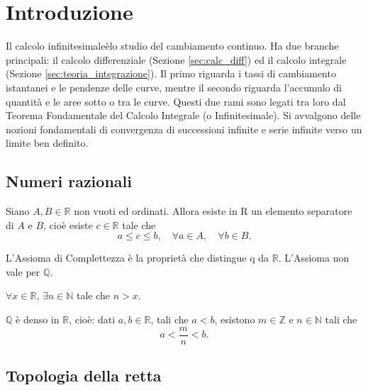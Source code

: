 \section{Introduzione}

Il calcolo infinitesimaleèlo studio del cambiamento continuo. Ha due branche principali: il calcolo differenziale (Sezione \ref{sec:calc_diff}) ed il calcolo integrale (Sezione \ref{sec:teoria_integrazione}). Il primo riguarda i tassi di cambiamento istantanei e le pendenze delle curve, mentre il secondo riguarda l'accumulo di quantità e le aree sotto o tra le curve. Questi due rami sono legati tra loro dal Teorema Fondamentale del Calcolo Integrale (o Infinitesimale). Si avvalgono delle nozioni fondamentali di convergenza di successioni infinite e serie infinite verso un limite ben definito.

\subsection{Numeri razionali}

\begin{theorem}\label{th:assioma_completezza}
    Siano $A,B\in\mathbb{R}$ non vuoti ed ordinati. Allora esiste in \gls{R} un elemento separatore di $A$ e $B$, cioè esiste $c\in\mathbb{R}$ tale che
    \begin{equation*}
        a\leq c\leq b, \quad\forall a\in A, \quad\forall b\in B.
    \end{equation*}
\end{theorem}

L'Assioma di Complettezza è la proprietà che distingue \gls{q} da $\mathbb{R}$. L'Assioma non vale per $\mathbb{Q}$.

\begin{property}
    $\forall x\in\mathbb{R},\,\exists n\in\mathbb{N}$ tale che $n>x$.
\end{property}

\begin{proposition}
    $\mathbb{Q}$ è denso in $\mathbb{R}$, cioè: dati $a,b\in\mathbb{R}$, tali che $a<b$, esistono $m\in\mathbb{Z}$ e $n\in\mathbb{N}$ tali che
    \begin{equation*}
        a<\frac{m}{n}<b.
    \end{equation*}
\end{proposition}

\subsection{Topologia della retta}

